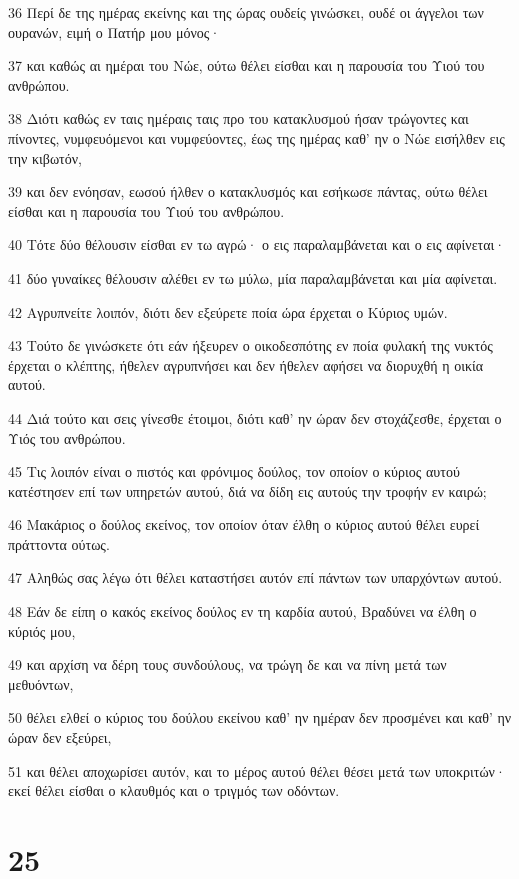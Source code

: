 \par 36 Περί δε της ημέρας εκείνης και της ώρας ουδείς γινώσκει, ουδέ οι άγγελοι των ουρανών, ειμή ο Πατήρ μου μόνος·
\par 37 και καθώς αι ημέραι του Νώε, ούτω θέλει είσθαι και η παρουσία του Υιού του ανθρώπου.
\par 38 Διότι καθώς εν ταις ημέραις ταις προ του κατακλυσμού ήσαν τρώγοντες και πίνοντες, νυμφευόμενοι και νυμφεύοντες, έως της ημέρας καθ' ην ο Νώε εισήλθεν εις την κιβωτόν,
\par 39 και δεν ενόησαν, εωσού ήλθεν ο κατακλυσμός και εσήκωσε πάντας, ούτω θέλει είσθαι και η παρουσία του Υιού του ανθρώπου.
\par 40 Τότε δύο θέλουσιν είσθαι εν τω αγρώ· ο εις παραλαμβάνεται και ο εις αφίνεται·
\par 41 δύο γυναίκες θέλουσιν αλέθει εν τω μύλω, μία παραλαμβάνεται και μία αφίνεται.
\par 42 Αγρυπνείτε λοιπόν, διότι δεν εξεύρετε ποία ώρα έρχεται ο Κύριος υμών.
\par 43 Τούτο δε γινώσκετε ότι εάν ήξευρεν ο οικοδεσπότης εν ποία φυλακή της νυκτός έρχεται ο κλέπτης, ήθελεν αγρυπνήσει και δεν ήθελεν αφήσει να διορυχθή η οικία αυτού.
\par 44 Διά τούτο και σεις γίνεσθε έτοιμοι, διότι καθ' ην ώραν δεν στοχάζεσθε, έρχεται ο Υιός του ανθρώπου.
\par 45 Τις λοιπόν είναι ο πιστός και φρόνιμος δούλος, τον οποίον ο κύριος αυτού κατέστησεν επί των υπηρετών αυτού, διά να δίδη εις αυτούς την τροφήν εν καιρώ;
\par 46 Μακάριος ο δούλος εκείνος, τον οποίον όταν έλθη ο κύριος αυτού θέλει ευρεί πράττοντα ούτως.
\par 47 Αληθώς σας λέγω ότι θέλει καταστήσει αυτόν επί πάντων των υπαρχόντων αυτού.
\par 48 Εάν δε είπη ο κακός εκείνος δούλος εν τη καρδία αυτού, Βραδύνει να έλθη ο κύριός μου,
\par 49 και αρχίση να δέρη τους συνδούλους, να τρώγη δε και να πίνη μετά των μεθυόντων,
\par 50 θέλει ελθεί ο κύριος του δούλου εκείνου καθ' ην ημέραν δεν προσμένει και καθ' ην ώραν δεν εξεύρει,
\par 51 και θέλει αποχωρίσει αυτόν, και το μέρος αυτού θέλει θέσει μετά των υποκριτών· εκεί θέλει είσθαι ο κλαυθμός και ο τριγμός των οδόντων.

\chapter{25}

